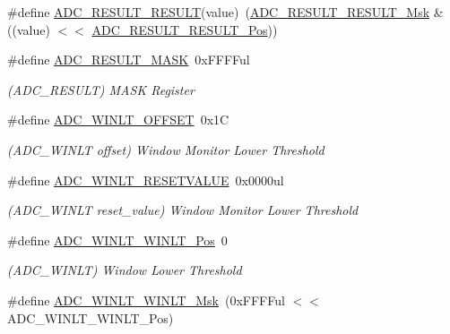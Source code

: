 \begin{DoxyCompactItemize}
\item 
\#define \mbox{\hyperlink{group___s_a_m_d21___a_d_c_ga2e9530a4b85ad58c5d84e4e44adeb9e3}{A\+D\+C\+\_\+\+R\+E\+S\+U\+L\+T\+\_\+\+R\+E\+S\+U\+LT}}(value)~(\mbox{\hyperlink{group___s_a_m_d21___a_d_c_ga62f7022b6431b384071429474546da50}{A\+D\+C\+\_\+\+R\+E\+S\+U\+L\+T\+\_\+\+R\+E\+S\+U\+L\+T\+\_\+\+Msk}} \& ((value) $<$$<$ \mbox{\hyperlink{group___s_a_m_d21___a_d_c_ga32c8bee520d5fa7ad752a631166250f8}{A\+D\+C\+\_\+\+R\+E\+S\+U\+L\+T\+\_\+\+R\+E\+S\+U\+L\+T\+\_\+\+Pos}}))
\item 
\#define \mbox{\hyperlink{group___s_a_m_d21___a_d_c_gafe06255d0d878f4218e65dabbc21c87a}{A\+D\+C\+\_\+\+R\+E\+S\+U\+L\+T\+\_\+\+M\+A\+SK}}~0x\+F\+F\+F\+Ful
\begin{DoxyCompactList}\small\item\em (A\+D\+C\+\_\+\+R\+E\+S\+U\+LT) M\+A\+SK Register \end{DoxyCompactList}\item 
\#define \mbox{\hyperlink{group___s_a_m_d21___a_d_c_ga8fd9cf580953e45e7f7b05deb9d5ac48}{A\+D\+C\+\_\+\+W\+I\+N\+L\+T\+\_\+\+O\+F\+F\+S\+ET}}~0x1C
\begin{DoxyCompactList}\small\item\em (A\+D\+C\+\_\+\+W\+I\+N\+LT offset) Window Monitor Lower Threshold \end{DoxyCompactList}\item 
\#define \mbox{\hyperlink{group___s_a_m_d21___a_d_c_ga3f5d0deb6bcb3a591e59ab0b85dc048b}{A\+D\+C\+\_\+\+W\+I\+N\+L\+T\+\_\+\+R\+E\+S\+E\+T\+V\+A\+L\+UE}}~0x0000ul
\begin{DoxyCompactList}\small\item\em (A\+D\+C\+\_\+\+W\+I\+N\+LT reset\+\_\+value) Window Monitor Lower Threshold \end{DoxyCompactList}\item 
\#define \mbox{\hyperlink{group___s_a_m_d21___a_d_c_ga8d8679254a2a5ba70a7378316be2b2e2}{A\+D\+C\+\_\+\+W\+I\+N\+L\+T\+\_\+\+W\+I\+N\+L\+T\+\_\+\+Pos}}~0
\begin{DoxyCompactList}\small\item\em (A\+D\+C\+\_\+\+W\+I\+N\+LT) Window Lower Threshold \end{DoxyCompactList}\item 
\#define \mbox{\hyperlink{group___s_a_m_d21___a_d_c_ga29c9d6e11a88066dbbb16527919a90c1}{A\+D\+C\+\_\+\+W\+I\+N\+L\+T\+\_\+\+W\+I\+N\+L\+T\+\_\+\+Msk}}~(0x\+F\+F\+F\+Ful $<$$<$ A\+D\+C\+\_\+\+W\+I\+N\+L\+T\+\_\+\+W\+I\+N\+L\+T\+\_\+\+Pos)
\item 

\end{DoxyCompactItemize}
